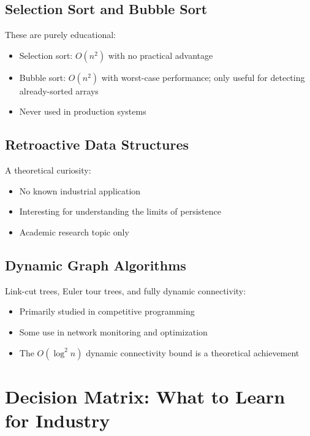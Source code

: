 \subsection{Selection Sort and Bubble Sort}

These are purely educational:
\begin{itemize}
    \item Selection sort: $O(n^2)$ with no practical advantage
    \item Bubble sort: $O(n^2)$ with worst-case performance; only useful for detecting already-sorted arrays
    \item Never used in production systems
\end{itemize}

\subsection{Retroactive Data Structures}

A theoretical curiosity:
\begin{itemize}
    \item No known industrial application
    \item Interesting for understanding the limits of persistence
    \item Academic research topic only
\end{itemize}

\subsection{Dynamic Graph Algorithms}

Link-cut trees, Euler tour trees, and fully dynamic connectivity:
\begin{itemize}
    \item Primarily studied in competitive programming
    \item Some use in network monitoring and optimization
    \item The $O(\log^2 n)$ dynamic connectivity bound is a theoretical achievement
\end{itemize}


\section{Decision Matrix: What to Learn for Industry}

